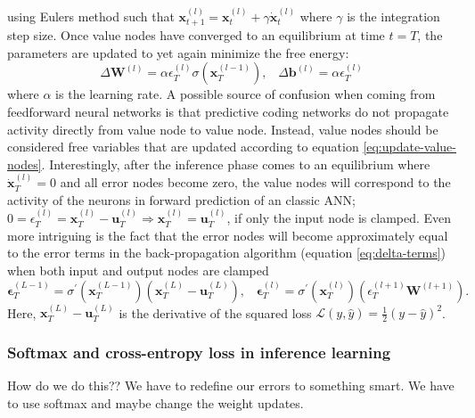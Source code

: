\documentclass[a4paper,11pt]{article} %
\begin{document}
using Eulers method such that $\mathbf{x}_{t+1}^{(l)} = \mathbf{x}_{t}^{(l)} + \gamma \dot{\mathbf{x}}_t^{(l)}$ where $\gamma$ is the integration step size. Once value nodes have converged to an equilibrium at time $t=T$, the parameters are updated to yet again minimize the free energy:
\begin{equation} \label{eq:il-weight-update}
  \Delta \mathbf{W}^{(l)} = \alpha \epsilon_T^{(l)} \sigma(\mathbf{x}_T^{(l-1)}), \hspace{10pt} \Delta \mathbf{b}^{(l)} = \alpha \epsilon_T^{(l)}
\end{equation}
where $\alpha$ is the learning rate. A possible source of confusion when coming from feedforward neural networks is that predictive coding networks do not propagate activity directly from value node to value node. Instead, value nodes should be considered free variables that are updated according to equation \ref{eq:update-value-nodes}. Interestingly, after the inference phase comes to an equilibrium where $\dot{\mathbf{x}}_T^{(l)} = 0$ and all error nodes become zero, the value nodes will correspond to the activity of the neurons in forward prediction of an classic ANN; $0 = \epsilon_{T}^{(l)}=\mathbf{x}_{T}^{(l)}-\mathbf{u}_{T}^{(l)}  \Rightarrow \mathbf{x}_{T}^{(l)} = \mathbf{u}_{T}^{(l)}$, if only the input node is clamped. Even more intriguing is the fact that the error nodes will become approximately equal to the error terms in the back-propagation algorithm (equation \ref{eq:delta-terms}) when both input and output nodes are clamped 
\begin{equation}
    \mathbf{\epsilon}_T^{(L-1)} = \sigma^{\prime}(\mathbf{x}_{T}^{(L-1)})\left(\mathbf{x}_{T}^{(L)} - \mathbf{u}_T^{(L)} \right), \hspace{10pt} \mathbf{\epsilon}_T^{(l)} = \sigma^{\prime}(\mathbf{x}_{T}^{(l)})\left(\epsilon_{T}^{(l+1)} \mathbf{W}^{(l+1)}\right).
\end{equation}
Here, $\mathbf{x}_{T}^{(L)} - \mathbf{u}_T^{(L)}$ is the derivative of the squared loss $\mathcal{L}(y, \hat{y}) = \frac{1}{2}\left( y - \hat{y}  \right)^2$. 


\subsubsection{Softmax and cross-entropy loss in inference learning}
How do we do this??
We have to redefine our errors to something smart.
We have to use softmax and maybe change the weight updates. 
\end{document}
